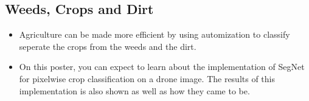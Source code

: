 \documentclass[
    ,title     = {{Image Segmentation for Smart Agriculture}}
    ,subject   = {{This is the subject of my work}}
    ,papersize = {{a1paper}}
    ,nocrop
]{dtuposter}
\begin{document}
%
%
\begin{dtuposterhead} %
\end{dtuposterhead}
%
%
\begin{dtupostercontent}
\section{Weeds, Crops and Dirt}
\begin{itemize}
	\item Agriculture can be made more efficient by using automization to classify seperate the crops from the weeds and the dirt.
	\item On this poster, you can expect to learn about the implementation of SegNet for pixelwise crop classification on a drone image. The results of this implementation is also shown as well as how they came to be.
\end{itemize}
 

\end{dtupostercontent}
\end{document}
